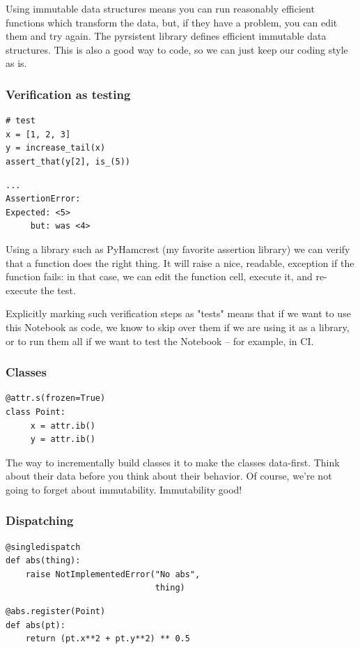 Using immutable data structures means you can run
reasonably efficient functions which transform the data,
but,
if they have a problem,
you can edit them and try again.
The pyrsistent library defines efficient immutable data structures.
This is also a good way to code,
so we can just keep our coding style as is.

\begin{frame}[fragile]
\frametitle{Verification as testing}

\begin{lstlisting}[frame=single]
# test
x = [1, 2, 3]
y = increase_tail(x)
assert_that(y[2], is_(5))
\end{lstlisting}

\begin{lstlisting}[frame=single]
...
AssertionError: 
Expected: <5>
     but: was <4>
\end{lstlisting}

\end{frame}

Using a library such as PyHamcrest
(my favorite assertion library)
we can verify that a function does the right thing.
It will raise a nice,
readable,
exception if the function fails:
in that case, we can edit the function cell,
execute it,
and re-execute the test.

Explicitly marking such verification steps as "tests"
means that if we want to use this Notebook as code,
we know to skip over them if we are using it as a library,
or to run them all if we want to test the Notebook --
for example, in CI.

\begin{frame}[fragile]
\frametitle{Classes}

\begin{lstlisting}[frame=single]
@attr.s(frozen=True)
class Point:
     x = attr.ib()
     y = attr.ib()
\end{lstlisting}

\end{frame}

The way to incrementally build classes it to make the classes
data-first.
Think about their data before you think about their behavior.
Of course, we're not going to forget about immutability.
Immutability good!

\begin{frame}[fragile]
\frametitle{Dispatching}

\begin{lstlisting}[frame=single]
@singledispatch
def abs(thing):
    raise NotImplementedError("No abs",
                              thing)
\end{lstlisting}

\begin{lstlisting}[frame=single]
@abs.register(Point)
def abs(pt):
    return (pt.x**2 + pt.y**2) ** 0.5
\end{lstlisting}

\end{frame}

